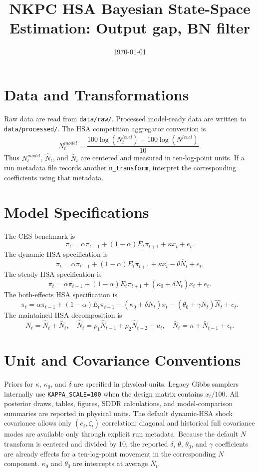 \documentclass[11pt]{article}
\title{NKPC HSA Bayesian State-Space Estimation: Output gap, BN filter}
\author{}
\date{\today}
\begin{document}
\maketitle

\section{Data and Transformations}
Raw data are read from \texttt{data/raw/}. Processed model-ready data are written to
\texttt{data/processed/}. The HSA competition aggregator convention is
\[
N^{model}_t=\frac{100\log(N^{level}_t)-\overline{100\log(N^{level})}}{10}.
\]
Thus \(N^{model}_t\), \(\hat N_t\), and \(\bar N_t\) are centered and measured
in ten-log-point units. If a run metadata file records another
\texttt{n\_transform}, interpret the corresponding coefficients using that
metadata.

\section{Model Specifications}
The CES benchmark is
\[
\pi_t=\alpha \pi_{t-1}+(1-\alpha)E_t\pi_{t+1}+\kappa x_t+e_t.
\]
The dynamic HSA specification is
\[
\pi_t=\alpha \pi_{t-1}+(1-\alpha)E_t\pi_{t+1}+\kappa x_t-\theta\hat N_t+e_t.
\]
The steady HSA specification is
\[
\pi_t=\alpha \pi_{t-1}+(1-\alpha)E_t\pi_{t+1}+(\kappa_0+\delta\bar N_t)x_t+e_t.
\]
The both-effects HSA specification is
\[
\pi_t=\alpha \pi_{t-1}+(1-\alpha)E_t\pi_{t+1}
+(\kappa_0+\delta\bar N_t)x_t-(\theta_0+\gamma\bar N_t)\hat N_t+e_t.
\]
The maintained HSA decomposition is
\[
N_t=\hat N_t+\bar N_t,\quad
\hat N_t=\rho_1\hat N_{t-1}+\rho_2\hat N_{t-2}+u_t,\quad
\bar N_t=n+\bar N_{t-1}+\epsilon_t.
\]

\section{Unit and Covariance Conventions}
Priors for \(\kappa\), \(\kappa_0\), and \(\delta\) are specified in
physical units. Legacy Gibbs samplers internally use \texttt{KAPPA\_SCALE=100}
when the design matrix contains \(x_t/100\). All posterior draws, tables,
figures, SDDR calculations, and model-comparison summaries are reported in
physical units. The default dynamic-HSA shock covariance allows only
\((e_t,\zeta_t)\) correlation; diagonal and historical full covariance modes
are available only through explicit run metadata.
Because the default \(N\) transform is centered and divided by 10, the reported
\(\delta\), \(\theta\), \(\theta_0\), and \(\gamma\) coefficients are already
effects for a ten-log-point movement in the corresponding \(N\) component.
\(\kappa_0\) and \(\theta_0\) are intercepts at average \(\bar N_t\).
\end{document}

